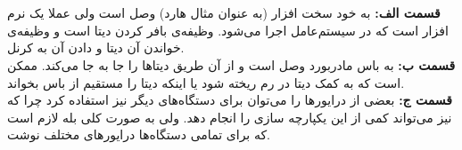 ~\\
\\\textbf{قسمت الف:}
به خود سخت افزار (به عنوان مثال هارد)
وصل است ولی
عملا یک نرم افزار است که در سیستم‌عامل اجرا می‌شود.
وظیفه‌ی
بافر کردن دیتا است و وظیفه‌ی
خواندن آن دیتا و دادن آن به کرنل.
\\\textbf{قسمت ب:}
به باس مادربورد وصل است و از آن طریق دیتا‌ها را جا به جا می‌کند. ممکن است که به کمک
دیتا در رم ریخته شود یا اینکه
دیتا را مستقیم از باس بخواند.
\\\textbf{قسمت ج:}
بعضی از درایور‌ها را می‌توان برای دستگاه‌های دیگر نیز استفاده کرد چرا که
نیز می‌تواند کمی از این یکپارچه سازی را انجام دهد. ولی به صورت کلی بله لازم است که برای
تمامی دستگاه‌ها درایور‌های مختلف نوشت.